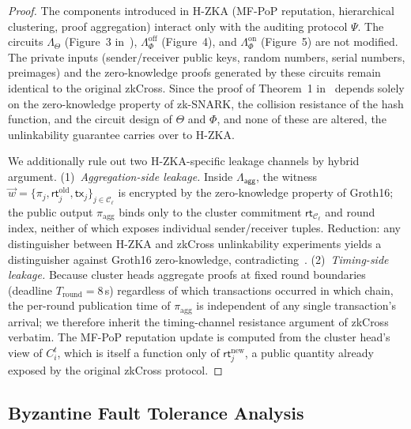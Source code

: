 \documentclass[journal]{IEEEtran}
\newcommand{\aggCircuit}{\Lambda_{\mathsf{agg}}}
\newcommand{\rootOld}{\mathsf{rt}_{j}^{\text{old}}}
\newcommand{\rootNew}{\mathsf{rt}_{j}^{\text{new}}}
\begin{document}
\begin{proof}
The components introduced in H-ZKA (MF-PoP reputation, hierarchical clustering, proof aggregation) interact only with the auditing protocol $\Psi$. The circuits $\Lambda_\Theta$ (Figure~3 in~\cite{guo2024zkcross}), $\Lambda_\Phi^{\text{off}}$ (Figure~4), and $\Lambda_\Phi^{\text{on}}$ (Figure~5) are not modified. The private inputs (sender/receiver public keys, random numbers, serial numbers, preimages) and the zero-knowledge proofs generated by these circuits remain identical to the original zkCross. Since the proof of Theorem~1 in~\cite{guo2024zkcross} depends solely on the zero-knowledge property of zk-SNARK, the collision resistance of the hash function, and the circuit design of $\Theta$ and $\Phi$, and none of these are altered, the unlinkability guarantee carries over to H-ZKA.

We additionally rule out two H-ZKA-specific leakage channels by hybrid argument. (1)~\textit{Aggregation-side leakage.} Inside $\aggCircuit$, the witness $\vec{w} = \{\pi_j, \rootOld, \mathsf{tx}_j\}_{j\in\mathcal{C}_\ell}$ is encrypted by the zero-knowledge property of Groth16; the public output $\pi_{\mathrm{agg}}$ binds only to the cluster commitment $\mathsf{rt}_{\mathcal{C}_\ell}$ and round index, neither of which exposes individual sender/receiver tuples. Reduction: any distinguisher between H-ZKA and zkCross unlinkability experiments yields a distinguisher against Groth16 zero-knowledge, contradicting~\cite{groth2016size}. (2)~\textit{Timing-side leakage.} Because cluster heads aggregate proofs at fixed round boundaries (deadline $T_{\mathrm{round}} = 8\,$s) regardless of which transactions occurred in which chain, the per-round publication time of $\pi_{\mathrm{agg}}$ is independent of any single transaction's arrival; we therefore inherit the timing-channel resistance argument of zkCross verbatim. The MF-PoP reputation update is computed from the cluster head's view of $C_i^t$, which is itself a function only of $\rootNew$, a public quantity already exposed by the original zkCross protocol.
\end{proof}

\subsection{Byzantine Fault Tolerance Analysis}
\end{document}
